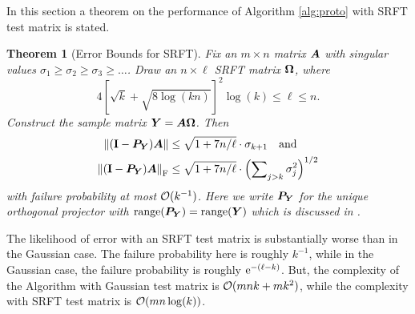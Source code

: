 \documentclass[12pt]{article}
\newtheorem{theorem}{Theorem}
\begin{document}
In this section a theorem on the performance of Algorithm \ref{alg:proto} with SRFT test matrix is stated.


\begin{theorem}[Error Bounds for SRFT]
\label{thm:SRFT}
Fix an $m \times n$ matrix $\bm{A}$ with singular values
$\sigma_1 \geq \sigma_2 \geq \sigma_3 \geq \dots$.
Draw an $n \times \ell$ SRFT matrix $\bm{\Omega}$, where
$$
4 \left[\sqrt{k} + \sqrt{8\log(kn)} \right]^2 \log(k) \leq \ell \leq n.
$$
Construct the sample matrix $\bm{Y} = \bm{A\Omega}$. Then
\begin{align*}
\left\Vert { (\mathbf{I}- \bm{P}_{\bm{Y}}) \bm{A} } \right\Vert
    &\leq \sqrt{1 + 7n/\ell} \cdot \sigma_{k+1}  \quad\text{and} \\
 \left\Vert { (\mathbf{I}- \bm{P}_{\bm{Y}}) \bm{A} } \right\Vert_{\mathrm{F}}
    &\leq \sqrt{1 + 7n/\ell} \cdot \left( \sum\nolimits_{j > k} \sigma_j^2 \right)^{1/2}
\end{align*}
with failure probability at most $\mathcal{O}(k^{-1})$.
Here we write
$\bm{P}_{\bm{Y}}$ for the unique orthogonal projector with
$\operatorname{range}(\bm{P}_{\bm{Y}}) = \operatorname{range}(\bm{Y})$ which is discussed in \cite[\S 8.2]{RM}.
\end{theorem}




The likelihood of error with an SRFT test matrix is substantially worse than
in the Gaussian case.  The failure probability here is roughly $k^{-1}$,
while in the Gaussian case, the failure probability is roughly $\mathrm{e}^{-(\ell - k)}$.
But, the complexity of the Algorithm with Gaussian test matrix is $\mathcal{O}(mnk + mk^2)$, while the complexity with SRFT test matrix is $\mathcal{O}(mn\log(k))$.

\end{document}
